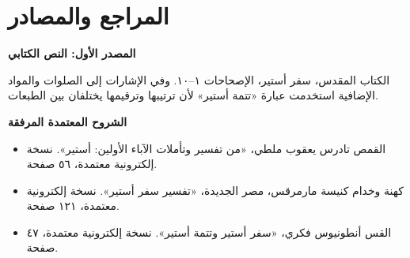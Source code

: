 \documentclass[12pt,a4paper]{article}
\begin{document}
\section*{المراجع والمصادر}
\vspace{0.2em}\noindent\textcolor{ochre}{\textbf{المصدر الأول: النص الكتابي}}\par\smallskip
الكتاب المقدس، سفر أستير، الإصحاحات ١–١٠. وفي الإشارات إلى الصلوات والمواد الإضافية استخدمت عبارة «تتمة أستير» لأن ترتيبها وترقيمها يختلفان بين الطبعات.\par\medskip
\vspace{0.2em}\noindent\textcolor{ochre}{\textbf{الشروح المعتمدة المرفقة}}\par\smallskip
\begin{itemize}[rightmargin=1.2em,leftmargin=0.5em,itemsep=0.25em,topsep=0.2em]
\item القمص تادرس يعقوب ملطي، «من تفسير وتأملات الآباء الأولين: أستير». نسخة إلكترونية معتمدة، ٥٦ صفحة.
\item كهنة وخدام كنيسة مارمرقس، مصر الجديدة، «تفسير سفر أستير». نسخة إلكترونية معتمدة، ١٢١ صفحة.
\item القس أنطونيوس فكري، «سفر أستير وتتمة أستير». نسخة إلكترونية معتمدة، ٤٧ صفحة.
\end{itemize}\medskip
\clearpage
\end{document}

